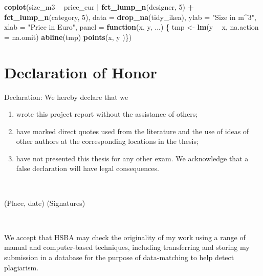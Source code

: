 \documentclass[a4paper, nobind]{templates/ociamthesis}
\newenvironment{Shaded}{\begin{snugshade}}{\end{snugshade}}
\newcommand{\ControlFlowTok}[1]{\textcolor[rgb]{0.13,0.29,0.53}{\textbf{#1}}}
\newcommand{\DataTypeTok}[1]{\textcolor[rgb]{0.13,0.29,0.53}{#1}}
\newcommand{\DecValTok}[1]{\textcolor[rgb]{0.00,0.00,0.81}{#1}}
\newcommand{\KeywordTok}[1]{\textcolor[rgb]{0.13,0.29,0.53}{\textbf{#1}}}
\newcommand{\NormalTok}[1]{#1}
\newcommand{\OperatorTok}[1]{\textcolor[rgb]{0.81,0.36,0.00}{\textbf{#1}}}
\newcommand{\StringTok}[1]{\textcolor[rgb]{0.31,0.60,0.02}{#1}}
\renewenvironment{Shaded}
{
  \vspace{4pt}%
  \begin{snugshade}%
}{%
  \end{snugshade}%
  \vspace{4pt}%
}
\begin{document}
\begin{Shaded}
\begin{Highlighting}[]
\KeywordTok{coplot}\NormalTok{(size_m3 }\OperatorTok{~}\StringTok{ }\NormalTok{price_eur }\OperatorTok{|}\StringTok{ }\KeywordTok{fct_lump_n}\NormalTok{(designer, }\DecValTok{5}\NormalTok{) }\OperatorTok{+}\StringTok{ }
\StringTok{         }\KeywordTok{fct_lump_n}\NormalTok{(category, }\DecValTok{5}\NormalTok{), }\DataTypeTok{data =} \KeywordTok{drop_na}\NormalTok{(tidy_ikea), }
       \DataTypeTok{ylab =} \StringTok{"Size in m^3"}\NormalTok{,}
       \DataTypeTok{xlab =} \StringTok{"Price in Euro"}\NormalTok{, }\DataTypeTok{panel =} \ControlFlowTok{function}\NormalTok{(x, y, ...) \{}
\NormalTok{         tmp <-}\StringTok{ }\KeywordTok{lm}\NormalTok{(y }\OperatorTok{~}\StringTok{ }\NormalTok{x, }\DataTypeTok{na.action =}\NormalTok{ na.omit)}
         \KeywordTok{abline}\NormalTok{(tmp)}
         \KeywordTok{points}\NormalTok{(x, y )\})}
\end{Highlighting}
\end{Shaded}

\hypertarget{declaration-of-honor}{%
\chapter{Declaration of Honor}\label{declaration-of-honor}}

Declaration: We hereby declare that we

\begin{enumerate}
\def\labelenumi{\arabic{enumi}.}
\item
  wrote this project report without the assistance of others;
\item
  have marked direct quotes used from the literature and the use of ideas of other authors at the corresponding locations in the thesis;
\item
  have not presented this thesis for any other exam. We acknowledge that a false declaration will have legal consequences.
\end{enumerate}

~~

(Place, date) (Signatures)

~~

We accept that HSBA may check the originality of my work using a range of manual and computer-based techniques, including transferring and storing my submission in a database for the purpose of data-matching to help detect plagiarism.

~~
\end{document}
